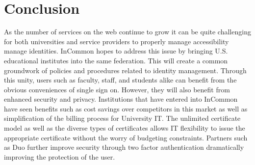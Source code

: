 \documentclass[9pt,twocolumn,twoside]{../../styles/osajnl}
\begin{document}
\section{Conclusion}

As the number of services on the web continue to grow it can be quite
challenging for both universities and service providers to properly
manage accessibility manage identities.  InCommon hopes to address
this issue by bringing U.S. educational institutes into the same
federation.  This will create a common groundwork of policies and
procedures related to identity management.  Through this unity, users
such as faculty, staff, and students alike can benefit from the
obvious conveniences of single sign on.  However, they will also benefit
from enhanced security and privacy.  Institutions that have entered
into InCommon have seen benefits such as cost savings over competitors
in this market as well as simplification of the billing process for
University IT.  The unlimited certificate model as well as the diverse
types of certificates allows IT flexibility to issue the appropriate
certificate without the worry of budgeting constraints.  Partners such
as Duo further improve security through two factor authentication
dramatically improving the protection of the user.




 
\end{document}
